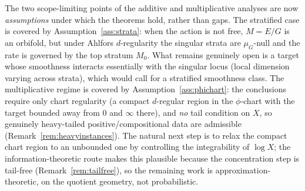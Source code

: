 \documentclass[11pt]{article}
\theoremstyle{plain}
\theoremstyle{definition}
\theoremstyle{remark}
\begin{document}
The two scope-limiting points of the additive and multiplicative analyses are now
\emph{assumptions} under which the theorems hold, rather than gaps. The stratified
case is covered by Assumption~\ref{ass:strata}: when the action is not free,
$M=E/G$ is an orbifold, but under Ahlfors $d$-regularity the singular strata are
$\mu_G$-null and the rate is governed by the top stratum $M_0$. What remains genuinely
open is a target whose smoothness interacts essentially with the singular locus
(local dimension varying across strata), which would call for a stratified
smoothness class. The multiplicative regime is covered by
Assumption~\ref{ass:phichart}: the conclusions require only chart regularity (a
compact $d$-regular region in the $\phi$-chart with the target bounded away from
$0$ and $\infty$ there), and \emph{no} tail condition on $X$, so genuinely
heavy-tailed positive/compositional data are admissible
(Remark~\ref{rem:heavyinstances}). The natural next step is to relax the compact
chart region to an unbounded one by controlling the integrability of $\log X$; the
information-theoretic route makes this plausible because the concentration step is
tail-free (Remark~\ref{rem:tailfree}), so the remaining work is
approximation-theoretic, on the quotient geometry, not probabilistic.
\end{document}
